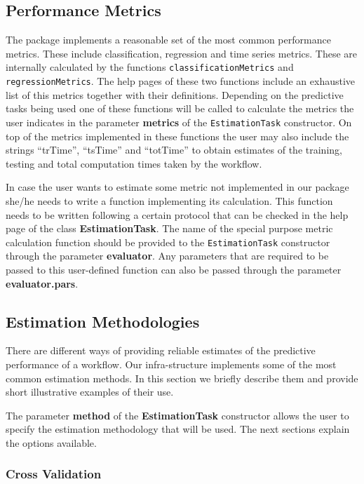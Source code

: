 \documentclass[10pt,a4paper]{article}\usepackage[]{graphicx}\usepackage[]{color}
\begin{document}
\subsection{Performance Metrics}

The package implements a reasonable set of the most common performance metrics. These include classification, regression and time series metrics. These are internally calculated by the functions \texttt{classificationMetrics} and \texttt{regressionMetrics}. The help pages of these two functions include an exhaustive list of this metrics together with their definitions. Depending on the predictive tasks being used one of these functions will be called to calculate the metrics the user indicates in the parameter \textbf{metrics} of the \texttt{EstimationTask} constructor. On top of the metrics implemented in these functions the user may also include the strings ``trTime'', ``tsTime'' and ``totTime'' to obtain estimates of the training, testing and total computation times taken by the workflow. 

In case the user wants to estimate some metric not implemented in our package she/he needs to write a function implementing its calculation. This function needs to be written following a certain  protocol that can be checked in the help page of the class \textbf{EstimationTask}. The name of the special purpose metric calculation function should be provided to the \texttt{EstimationTask} constructor through the parameter \textbf{evaluator}. Any parameters that are required to be passed to this user-defined function can also be passed through the parameter \textbf{evaluator.pars}.


\subsection{Estimation Methodologies}\label{sec:expMeth}

There are different ways of providing reliable estimates of the
predictive performance of a workflow. Our infra-structure implements some
of the most common estimation methods. In this section we
briefly describe them and provide short illustrative examples of their
use.

The parameter \textbf{method} of the \textbf{EstimationTask} constructor allows the user to specify the estimation methodology that will be used. The next sections explain the options available.

\subsubsection{Cross Validation}
\end{document}
